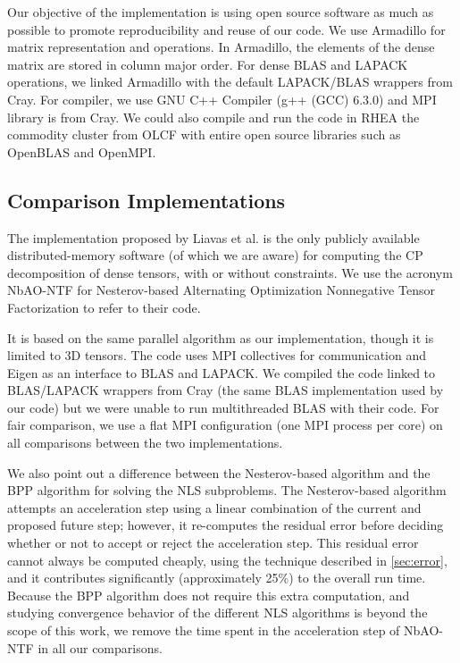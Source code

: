 Our objective of the implementation is using open source software as much as possible 
to promote reproducibility and reuse of our code.
We use Armadillo \cite{sanderson2010} for matrix representation
and operations.  
In Armadillo, the elements of the dense matrix are stored in column major order.
For dense BLAS and LAPACK operations, we linked Armadillo with the default LAPACK/BLAS wrappers from Cray. 
For compiler, we use GNU C++ Compiler (g++ (GCC) 6.3.0) and MPI library is from Cray.  We could also 
compile and run the code in RHEA the commodity cluster from OLCF with entire open source libraries such as OpenBLAS and OpenMPI. 

\subsection{Comparison Implementations}
The implementation proposed by Liavas et al. \cite{LK+17b} is the only publicly available distributed-memory software (of which we are aware) for computing the CP decomposition of dense tensors, with or without constraints.
We use the acronym NbAO-NTF for Nesterov-based Alternating Optimization Nonnegative Tensor Factorization to refer to their code.

It is based on the same parallel algorithm as our implementation, though it is limited to 3D tensors.
The code uses MPI collectives for communication and Eigen \cite{eigenweb} as an interface to BLAS and LAPACK.
We compiled the code linked to BLAS/LAPACK wrappers from Cray  (the same BLAS implementation used by our code) but we were unable to run multithreaded BLAS with their code.
For fair comparison, we use a flat MPI configuration (one MPI process per core) on all comparisons between the two implementations.

We also point out a difference between the Nesterov-based algorithm and the BPP algorithm for solving the NLS subproblems.
The Nesterov-based algorithm attempts an acceleration step using a linear combination of the current and proposed future step; however, it re-computes the residual error before deciding whether or not to accept or reject the acceleration step.
This residual error cannot always be computed cheaply, using the technique described in \cref{sec:error}, and it contributes significantly (approximately 25\%) to the overall run time.
Because the BPP algorithm does not require this extra computation, and studying convergence behavior of the different NLS algorithms is beyond the scope of this work, we remove the time spent in the acceleration step of NbAO-NTF in all our comparisons.

